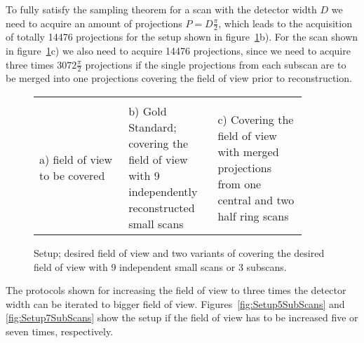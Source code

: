 To fully satisfy the sampling theorem for a scan with the detector width $D$ we need to acquire an amount of projections $P=D\frac{\pi}{2}$, which leads to the acquisition of totally 14476 projections for the setup shown in figure~\ref{fig:Setup3SubScans}b). For the scan shown in figure~\ref{fig:Setup3SubScans}c) we also need to acquire 14476 projections, since we need to acquire three times $3072\frac{\pi}{2}$ projections if the single projections from each subscan are to be merged into one projections covering the field of view prior to reconstruction.

\ifiucr
	\begin{figure}%
		\centering%
		\caption{Setup; desired field of view and two variants of covering the desired field of view with 9 independent small scans or 3 subscans.}%
		\begin{tabular}{p{0.3\linewidth}p{0.3\linewidth}p{0.3\linewidth}}
			 &%
			 &%
			\\%
			a) field of view to be covered &%
			b) Gold Standard; covering the field of view with 9 independently reconstructed small scans&%
			c) Covering the field of view with merged projections from one central and two half ring scans\\%
		\end{tabular}%
		\label{fig:Setup3SubScans}%
	\end{figure}%
\else
	\begin{figure*}[htp]
		\centering%
		\caption{Setup; desired field of view and two variants of covering the desired field of view with 9 independent small scans or 3 subscans.}%
		\label{fig:Setup3SubScans}%
	\end{figure*}
\fi

The protocols shown for increasing the field of view to three times the detector width can be iterated to bigger field of view. Figures~\ref{fig:Setup5SubScans} and \ref{fig:Setup7SubScans} show the setup if the field of view has to be increased five or seven times, respectively.

